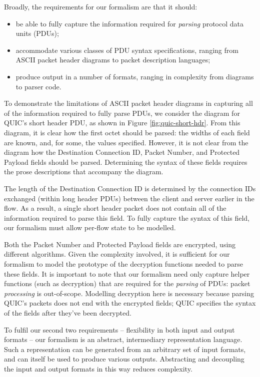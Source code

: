 \documentclass[10pt,sigconf]{acmart}
\begin{document}
Broadly, the requirements for our formalism are that it should:
\begin{itemize}
	\item be able to fully capture the information required for \emph{parsing} protocol
		  data units (PDUs);
	\item accommodate various classes of PDU syntax specifications, ranging from ASCII
		  packet header diagrams to packet description languages;
	\item produce output in a number of formats, ranging in complexity from diagrams
	      to parser code.
\end{itemize}

To demonstrate the limitations of ASCII packet header diagrams in capturing all of the
information required to fully parse PDUs, we consider the diagram for QUIC's short header
PDU, as shown in Figure \ref{fig:quic-short-hdr}. From this diagram, it is clear how the
first octet should be parsed: the widths of each field are known, and, for some, the
values specified. However, it is not clear from the diagram how the Destination Connection
ID, Packet Number, and Protected Payload fields should be parsed. Determining the syntax
of these fields requires the prose descriptions that accompany the diagram.

The length of the Destination Connection ID is determined by the connection IDs exchanged
(within long header PDUs) between the client and server earlier in the flow. As a result,
a single short header packet does not contain all of the information required to parse
this field. To fully capture the syntax of this field, our formalism must allow per-flow
state to be modelled.

Both the Packet Number and Protected Payload fields are encrypted, using different
algorithms. Given the complexity involved, it is sufficient for our formalism to model the
prototype of the decryption functions needed to parse these fields. It is important to
note that our formalism need only capture helper functions (such as decryption) that are
required for the \emph{parsing} of PDUs: packet \emph{processing} is out-of-scope.
Modelling decryption here is necessary because parsing QUIC's packets does not end with
the encrypted fields; QUIC specifies the syntax of the fields after they've been
decrypted.

To fulfil our second two requirements -- flexibility in both input and output formats --
our formalism is an abstract, intermediary representation language. Such a representation
can be generated from an arbitrary set of input formats, and can itself be used to 
produce various outputs. Abstracting and decoupling the input and output formats in this
way reduces complexity.
\end{document}
